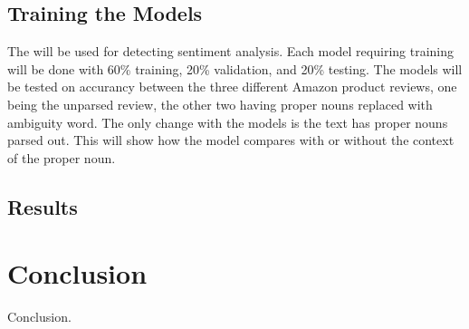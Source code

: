 \documentclass[11pt,a4paper]{article}
\begin{document}
\subsection{Training the Models}

The  will be used for detecting sentiment analysis. Each model requiring training will be done with 60\% training, 20\% validation, and 20\% testing. The models will be tested on accurancy between the three different Amazon product reviews, one being the unparsed review, the other two having proper nouns replaced with ambiguity word. The only change with the models is the text has proper nouns parsed out. This will show how the model compares with or without the context of the proper noun.

\subsection{Results}

\section{Conclusion}

Conclusion.



\end{document}
